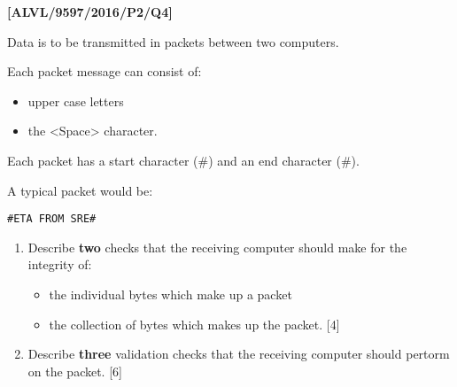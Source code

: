 \item \textbf{{[}ALVL/9597/2016/P2/Q4{]} }

Data is to be transmitted in packets between two computers. 

Each packet message can consist of: 
\begin{itemize}
\item upper case letters 
\item the <Space> character. 
\end{itemize}
Each packet has a start character (\#) and an end character (\#). 

A typical packet would be: 
\begin{center}
\texttt{\#ETA FROM SRE\#}
\par\end{center}
\begin{enumerate}
\item Describe\textbf{ two} checks that the receiving computer should make
for the integrity of:
\begin{itemize}
\item the individual bytes which make up a packet
\item the collection of bytes which makes up the packet. \hfill{} {[}4{]}
\end{itemize}
\item Describe \textbf{three} validation checks that the receiving computer
should pertorm on the packet. \hfill{}{[}6{]}
\end{enumerate}